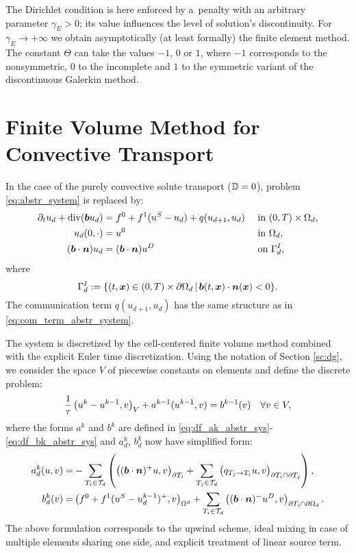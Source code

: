The Dirichlet condition is here enforced by a~penalty with an arbitrary parameter $\gamma_E>0$;
 its value influences the level of solution's discontinuity.
For $\gamma_E\to+\infty$ we obtain asymptotically (at least formally) the finite element method.
The constant $\Theta$ can take the values $-1$, $0$ or $1$,
 where $-1$ corresponds to the nonsymmetric, $0$ to the incomplete and $1$ to the symmetric variant of the discontinuous Galerkin method.




\section{Finite Volume Method for Convective Transport}

In the case of the purely convective solute transport ($\tn D=0$), problem \eqref{eq:abstr_system} is replaced by:
\begin{subequations}
 \label{eq:abstr_system_conv}
 \begin{align}
  \partial_t u_d + \div(\vc b u_d) &= f^0+f^1(u^S-u_d) + q(u_{d+1},u_d) &&\mbox{ in }(0,T)\times\Omega_d,\\
  u_d(0,\cdot) &= u^0 &&\mbox{ in }\Omega_d,\\
  \label{eq:bc_abstr_conc} (\vc b\cdot\vc n) u_d &= (\vc b\cdot\vc n) u^D &&\mbox{ on }\Gamma_d^I,
 \end{align}
\end{subequations}
 where
 \[ \Gamma_d^I:=\{(t,\vc x)\in(0,T)\times\partial\Omega_d\where \vc b(t,\vc x)\cdot\vc n(\vc x)<0\}. \]
 The communication term $q(u_{d+1},u_d)$ has the same structure as in \eqref{eq:com_term_abstr_system}.

The system is discretized by the cell-centered finite volume method combined with the explicit Euler time discretization.
Using the notation of Section \ref{sc:dg}, we consider the space $V$ of piecewise constants on elements and define the discrete problem:
\begin{equation*}
 \frac1\tau\sc{u^{k}-u^{k-1}}{v}_{V} + a^{k-1}(u^{k-1},v) = b^{k-1}(v) \quad \forall v\in V,
\end{equation*}
where the forms $a^k$ and $b^k$ are defined in \eqref{eq:df_ak_abstr_sys}-\eqref{eq:df_bk_abstr_sys} and $a^k_d$, $b^k_d$ now have simplified form:
\begin{align*}
 a^{k}_d(u,v) = & -\sum_{T_i\in\Td}\left(\sc{(\vc b\cdot\vc n)^+u}{v}_{\partial T_i} + \sum_{T_j\in\Td}\sc{q_{T_j\to T_i}u}{v}_{\partial T_i\cap\partial T_j} \right),\\
 b^{k}_d(v) = &\sc{f^0+f^1(u^S-u^{k-1}_d)^+}{v}_{\Omega^d} + \sum_{T_i\in\Td}\sc{(\vc b\cdot\vc n)^-u^D}{v}_{\partial T_i\cap\partial\Omega_d}.
\end{align*}
The above formulation corresponds to the upwind scheme, ideal mixing in case of multiple elements sharing one side, and explicit treatment of linear source term.

% 

